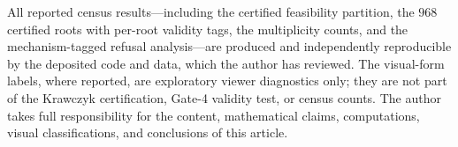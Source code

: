 \documentclass[pdflatex,sn-mathphys-num]{sn-jnl}
\begin{document}
All reported census results---including the certified feasibility partition, the $968$ certified roots with per-root validity tags, the multiplicity counts, and the mechanism-tagged refusal analysis---are produced and independently reproducible by the deposited code and data, which the author has reviewed. The visual-form labels, where reported, are exploratory viewer diagnostics only; they are not part of the Krawczyk certification, Gate-4 validity test, or census counts. The author takes full responsibility for the content, mathematical claims, computations, visual classifications, and conclusions of this article.


\end{document}
